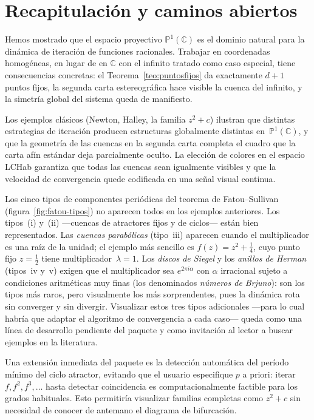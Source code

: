 \documentclass[11pt,a4paper]{article}
\theoremstyle{plain}
\theoremstyle{definition}
\theoremstyle{remark}
\newcommand{\C}{\mathbb{C}}
\newcommand{\Puno}{\mathbb{P}^1(\mathbb{C})}
\begin{document}
\section{Recapitulación y caminos abiertos}
\label{sec:conclusion}

Hemos mostrado que el espacio proyectivo $\Puno$ es el dominio natural
para la dinámica de iteración de funciones racionales.
Trabajar en coordenadas homogéneas, en lugar de en $\C$ con el infinito
tratado como caso especial, tiene consecuencias concretas: el
Teorema~\ref{teo:puntosfijos} da exactamente $d+1$ puntos fijos, la
segunda carta estereográfica hace visible la cuenca del infinito, y la
simetría global del sistema queda de manifiesto.

Los ejemplos clásicos (Newton, Halley, la familia $z^2+c$)  ilustran
que distintas estrategias de iteración producen estructuras globalmente
distintas en~$\Puno$, y que la geometría de las cuencas en la segunda
carta completa el cuadro que la carta afín estándar deja parcialmente
oculto.
La elección de colores en el espacio LCHab garantiza que todas las
cuencas sean igualmente visibles y que la velocidad de convergencia
quede codificada en una señal visual continua.

Los cinco tipos de componentes periódicas del teorema de
Fatou--Sullivan (figura~\ref{fig:fatou-tipos}) no aparecen todos en
los ejemplos anteriores.
Los tipos~(i) y~(ii) —cuencas de atractores fijos y de ciclos— están
bien representados.
Las \emph{cuencas parabólicas} (tipo~iii) aparecen cuando el
multiplicador es una raíz de la unidad; el ejemplo más sencillo es
$f(z)=z^2+\tfrac{1}{4}$, cuyo punto fijo $z=\tfrac{1}{2}$ tiene
multiplicador~$\lambda=1$.
Los \emph{discos de Siegel} y los \emph{anillos de Herman}
(tipos~iv y~v) exigen que el multiplicador sea $e^{2\pi i\alpha}$ con
$\alpha$ irracional sujeto a condiciones aritméticas muy finas
(los denominados \emph{números de Brjuno}): son los tipos más raros,
pero visualmente los más sorprendentes, pues la dinámica rota sin
converger y sin divergir.
Visualizar estos tres tipos adicionales —para lo cual habría que
adaptar el algoritmo de convergencia a cada caso— queda como una
línea de desarrollo pendiente del paquete y como invitación al lector
a buscar ejemplos en la literatura.

Una extensión inmediata del paquete es la detección automática del
período mínimo del ciclo atractor, evitando que el usuario especifique
$p$ a priori: iterar $f, f^2, f^3,\ldots$ hasta detectar coincidencia
es computacionalmente factible para los grados habituales.
Esto permitiría visualizar familias completas como $z^2+c$ sin
necesidad de conocer de antemano el diagrama de bifurcación.
\end{document}
